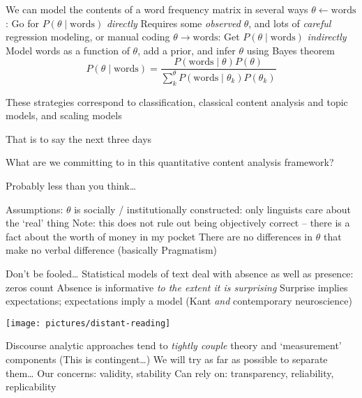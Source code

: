 \documentclass{mediumfoils}
\begin{document}

We can model the contents of a word frequency matrix in several ways
\ita
\itm $\theta \longleftarrow \text{words}$: Go for $P(\theta \mid \text{words})$ \textit{directly}
\ita
\itm Requires some \textit{observed} $\theta$, and lots of \textit{careful} regression modeling, or manual coding
\itz
\itm $\theta \longrightarrow \text{words}$: Get $P(\theta \mid \text{words})$ \textit{indirectly}
\ita
\itm Model words as a function of $\theta$, add a prior, and infer $\theta$ using Bayes theorem
\[
P(\theta \mid \text{words}) = \frac{P(\text{words} \mid \theta)P(\theta)}{\sum^\theta_k P(\text{words} \mid \theta_k)P(\theta_k)}
\]
\itz
\itz 



These strategies correspond to classification, classical content analysis and topic models, and scaling models

That is to say
\ita
\itm the next three days
\itz


What are we committing to in this quantitative content analysis framework?

Probably less than you think\ldots

Assumptions: 
\ita
\itm $\theta$ is socially / institutionally constructed: only linguists care about the `real' thing
\ita
\itm Note: this does not rule out being objectively correct -- there is a fact about the worth of money in my pocket
\itz
\itm There are no differences in $\theta$ that make no verbal difference (basically Pragmatism)
\itz


Don't be fooled\ldots
\ita
\itm Statistical models of text deal with absence as well as presence: zeros count
\itm Absence is informative \textit{to the extent it is surprising}
\itm Surprise implies expectations; expectations imply a model (Kant \textit{and} contemporary neuroscience)
\itz

\newpage

\centerline{\texttt{[image: pictures/distant-reading]}}


Discourse analytic approaches tend to \textit{tightly couple} theory and `measurement' components
\ita
\itm (This is contingent\ldots)
\itz
We will try as far as possible to separate them\ldots
\ita
\itm Our concerns: validity, stability
\itm Can rely on: transparency, reliability, replicability
\itz
\end{document}
